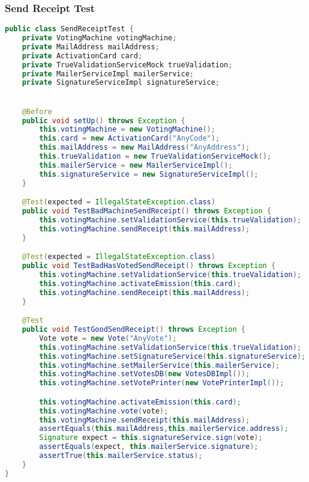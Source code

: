 \documentclass[11pt]{article}
\begin{document}
	\subsubsection{Send Receipt Test}
	\begin{lstlisting}[basicstyle=\ttfamily\scriptsize,language=Java]
public class SendReceiptTest {
    private VotingMachine votingMachine;
    private MailAddress mailAddress;
    private ActivationCard card;
    private TrueValidationServiceMock trueValidation;
    private MailerServiceImpl mailerService;
    private SignatureServiceImpl signatureService;


    @Before
    public void setUp() throws Exception {
        this.votingMachine = new VotingMachine();
        this.card = new ActivationCard("AnyCode");
        this.mailAddress = new MailAddress("AnyAddress");
        this.trueValidation = new TrueValidationServiceMock();
        this.mailerService = new MailerServiceImpl();
        this.signatureService = new SignatureServiceImpl();
    }

    @Test(expected = IllegalStateException.class)
    public void TestBadMachineSendReceipt() throws Exception {
        this.votingMachine.setValidationService(this.trueValidation);
        this.votingMachine.sendReceipt(this.mailAddress);
    }

    @Test(expected = IllegalStateException.class)
    public void TestBadHasVotedSendReceipt() throws Exception {
        this.votingMachine.setValidationService(this.trueValidation);
        this.votingMachine.activateEmission(this.card);
        this.votingMachine.sendReceipt(this.mailAddress);
    }

    @Test
    public void TestGoodSendReceipt() throws Exception {
        Vote vote = new Vote("AnyVote");
        this.votingMachine.setValidationService(this.trueValidation);
        this.votingMachine.setSignatureService(this.signatureService);
        this.votingMachine.setMailerService(this.mailerService);
        this.votingMachine.setVotesDB(new VotesDBImpl());
        this.votingMachine.setVotePrinter(new VotePrinterImpl());

        this.votingMachine.activateEmission(this.card);
        this.votingMachine.vote(vote);
        this.votingMachine.sendReceipt(this.mailAddress);
        assertEquals(this.mailAddress,this.mailerService.address);
        Signature expect = this.signatureService.sign(vote);
        assertEquals(expect, this.mailerService.signature);
        assertTrue(this.mailerService.status);
    }
}
	\end{lstlisting}
\end{document}
